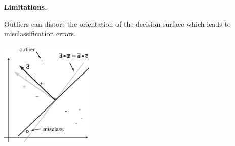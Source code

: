 \documentclass[a4paper,blends,pdf,colorBG,slideColor]{prosper}
\begin{document}
{\bf Limitations.}

Outliers can distort the orientation of the decision surface which
leads to misclassification errors.  

\vspace{.2in}

\begin{center}
\includegraphics[height=50mm]{figures/fig04-05.eps}
\end{center}
\es
\end{document}
